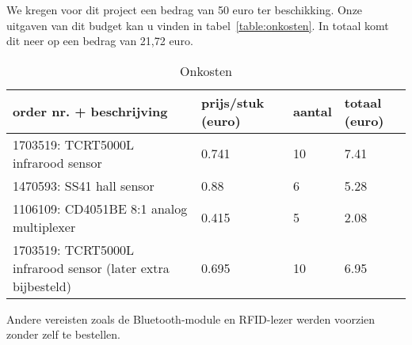 We kregen voor dit project een bedrag van 50 euro ter beschikking.
Onze uitgaven van dit budget kan u vinden in tabel~\vref{table:onkosten}. In totaal komt dit neer op een bedrag van 21,72 euro.  

\begin{table}[H]
\renewcommand{\arraystretch}{2}
\centering
\begin{tabular}{llll}
order nr. + beschrijving                                                           & prijs/stuk (euro)          & aantal                  & totaal (euro)             \\ \hline
\multicolumn{1}{|l|}{1703519: TCRT5000L infrarood sensor}                          & \multicolumn{1}{l|}{0.741} & \multicolumn{1}{l|}{10} & \multicolumn{1}{l|}{7.41} \\ \hline
\multicolumn{1}{|l|}{1470593: SS41 hall sensor}                                    & \multicolumn{1}{l|}{0.88}  & \multicolumn{1}{l|}{6}  & \multicolumn{1}{l|}{5.28} \\ \hline
\multicolumn{1}{|l|}{1106109: CD4051BE 8:1 analog multiplexer}                     & \multicolumn{1}{l|}{0.415} & \multicolumn{1}{l|}{5}  & \multicolumn{1}{l|}{2.08} \\ \hline
\multicolumn{1}{|l|}{1703519: TCRT5000L infrarood sensor (later extra bijbesteld)} & \multicolumn{1}{l|}{0.695} & \multicolumn{1}{l|}{10} & \multicolumn{1}{l|}{6.95} \\ \hline
\end{tabular}
\caption{Onkosten}
\label{table:onkosten}
\end{table}

Andere vereisten zoals de Bluetooth-module en RFID-lezer werden voorzien zonder zelf te bestellen.